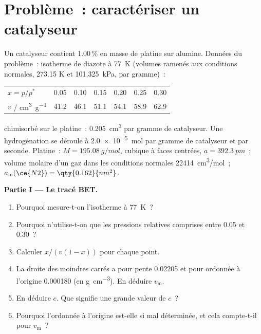 \section{Problème~: caractériser un catalyseur}

\begin{problem}
\label{pb:b3:surfaces-catalysis:1}
Un catalyseur contient 1.00\,\% en masse de platine sur alumine. Données
du problème~: isotherme de diazote à \qty{77}{K} (volumes ramenés aux
conditions normales, 273.15 K et
\qty{101.325}{kPa}, par gramme)~:
\begin{center}\small
\begin{tabular}{lcccccc}
\hline
$x = p/p^*$ & 0.05 & 0.10 & 0.15 & 0.20 & 0.25 & 0.30 \\
$v$ / \unit{cm^3.g^{-1}} & 41.2 & 46.1 & 51.1 & 54.1 & 58.9 & 62.9 \\ \hline
\end{tabular}
\end{center}
 chimisorbé sur le platine~: \qty{0.205}{cm^3} par gramme de
catalyseur. Une hydrogénation se déroule à \qty{2.0e-5}{mol} par gramme
de catalyseur et par seconde. Platine~: $M = \qty{195.08}{g/mol}$,
cubique à faces centrées,
$a = \qty{392.3}{pm}$~; volume molaire d'un gaz dans les conditions
normales \qty{22414}{cm^3/mol}~;
$a_{\mathrm m}(\ce{N2}) = \qty{0.162}{nm^2}$.

\medskip\noindent\textbf{Partie I --- Le tracé BET.}
\begin{enumerate}
  \item Pourquoi mesure-t-on l'isotherme à \qty{77}{K}~?
  \item Pourquoi n'utilise-t-on que les pressions relatives comprises
        entre 0.05 et 0.30~?
  \item Calculer $x/(v(1 - x))$ pour chaque point.
  \item La droite des moindres carrés a pour pente \num{0.02205} et pour
        ordonnée à l'origine \num{0.000180} (en
        \unit{g.cm^{-3}}). En déduire $v_{\mathrm m}$.
  \item En déduire $c$. Que signifie une grande valeur de $c$~?
  \item Pourquoi l'ordonnée à l'origine est-elle si mal déterminée, et
        cela compte-t-il pour $v_{\mathrm m}$~?
\end{enumerate}


\end{problem}
